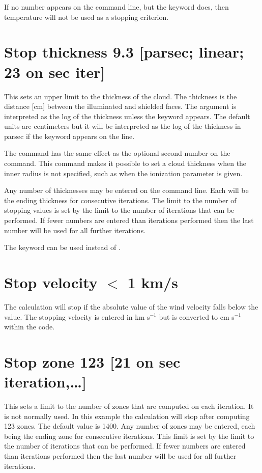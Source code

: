 If no number appears on the command line,
but the keyword  does,
then temperature will not be used as a stopping criterion.

\section{Stop thickness 9.3 [parsec; linear; 23 on sec iter] }
\label{sec:CommandStopThckness}

This sets an upper limit to the thickness of the cloud.
The thickness is the distance [cm] between the illuminated
and shielded faces.
The argument
is interpreted as the log of the thickness unless the keyword
 appears.
The default units are centimeters but it will be interpreted
as the log
of the thickness in parsec if the keyword 
appears on the line.

The  command has the same effect
as the optional second
number on the  command.
This command makes
it possible to set a cloud thickness when the inner radius
is not specified,
such as when the ionization parameter is given.

Any number of thicknesses may be entered on the command line.
Each will
be the ending thickness for consecutive iterations.
The limit to the number
of stopping values is set by the limit to the number of iterations that
can be performed.
If fewer numbers are entered than iterations performed
then the last number will be used for all further iterations.

The keyword  can be used instead of .

\section{Stop velocity $<$ 1 km/s}

The calculation will stop if the absolute value of the wind velocity
falls below the value.
The stopping velocity is entered in km s$^{-1}$ but is
converted to cm s$^{-1}$ within the code.

\section{Stop zone 123 [21 on sec iteration,\dots]}

This sets a limit to the number of zones that are computed on each
iteration.
It is not normally used.
In this example the calculation will
stop after computing 123 zones.
The default value is 1400.
Any number
of zones may be entered, each being the ending zone for consecutive
iterations.
This limit is set by the limit to the number of iterations
that can be performed.
If fewer numbers are entered than iterations
performed then the last number will be used for all further iterations.

